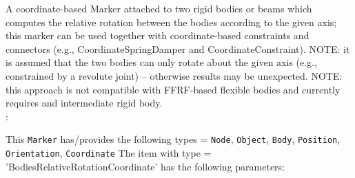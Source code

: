 \label{sec:item:MarkerBodiesRelativeRotationCoordinate}
A coordinate-based Marker attached to two rigid bodies or beams which computes the relative rotation between the bodies according to the given axis; this marker can be used together with coordinate-based constraints and connectors (e.g., CoordinateSpringDamper and CoordinateConstraint). NOTE: it is assumed that the two bodies can only rotate about the given axis (e.g., constrained by a revolute joint) -- otherwise results may be unexpected. NOTE: this approach is not compatible with FFRF-based flexible bodies and currently requires and intermediate rigid body.
\vspace{12pt}\\

\noindent {}:
\bi
  \item This \texttt{Marker} has/provides the following types = \texttt{Node}, \texttt{Object}, \texttt{Body}, \texttt{Position}, \texttt{Orientation}, \texttt{Coordinate}
\ei\vspace{12pt} \noindent 
The item  with type = 'BodiesRelativeRotationCoordinate' has the following parameters:
\vspace{-0.5cm}\\
\vspace{-0.5cm}\\
